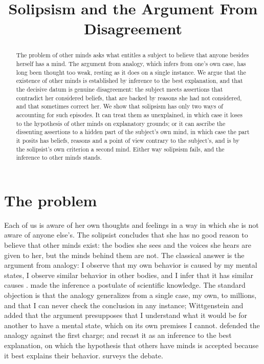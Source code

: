 \documentclass{situationist-preprint}
\title{Solipsism and the Argument From Disagreement}
\begin{document}
\maketitle

\begin{abstract}
The problem of other minds asks what entitles a subject to believe that anyone besides herself has a mind. The argument from analogy, which infers from one's own case, has long been thought too weak, resting as it does on a single instance. We argue that the existence of other minds is established by inference to the best explanation, and that the decisive datum is genuine disagreement: the subject meets assertions that contradict her considered beliefs, that are backed by reasons she had not considered, and that sometimes correct her. We show that solipsism has only two ways of accounting for such episodes. It can treat them as unexplained, in which case it loses to the hypothesis of other minds on explanatory grounds; or it can ascribe the dissenting assertions to a hidden part of the subject's own mind, in which case the part it posits has beliefs, reasons and a point of view contrary to the subject's, and is by the solipsist's own criterion a second mind. Either way solipsism fails, and the inference to other minds stands.
\end{abstract}

\section{The problem}

Each of us is aware of her own thoughts and feelings in a way in which she is not aware of anyone else's. The solipsist concludes that she has no good reason to believe that other minds exist: the bodies she sees and the voices she hears are given to her, but the minds behind them are not. The classical answer is the argument from analogy: I observe that my own behavior is caused by my mental states, I observe similar behavior in other bodies, and I infer that it has similar causes \citep{Mill1865}. \citet{Russell1948} made the inference a postulate of scientific knowledge. The standard objection is that the analogy generalizes from a single case, my own, to millions, and that I can never check the conclusion in any instance; Wittgenstein and \citet{Malcolm1958} added that the argument presupposes that I understand what it would be for another to have a mental state, which on its own premises I cannot. \citet{Hyslop1972} defended the analogy against the first charge; \citet{Pargetter1984} and \citet{Melnyk1994} recast it as an inference to the best explanation, on which the hypothesis that others have minds is accepted because it best explains their behavior. \citet{Avramides2001} surveys the debate.
\end{document}

